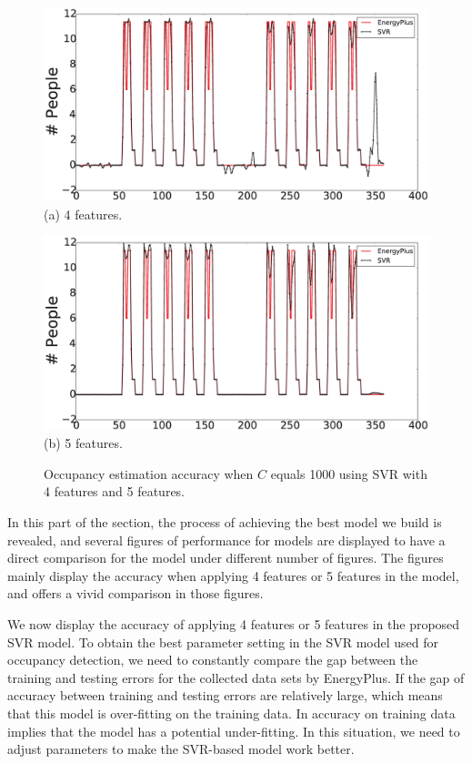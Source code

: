 \begin{figure}[h]
\begin{minipage}{\textwidth}
\centering\includegraphics[width=5in]{./Pics/1000C4Features.eps}
(a) 4 features.
\end{minipage}
\hfill

\vspace{3ex}

\noindent\begin{minipage}{\textwidth}
\centering\includegraphics[width=5in]{./Pics/1000C5Features.eps}
(b) 5 features.
\end{minipage}
\hfill
\caption{Occupancy estimation accuracy when $C$ equals 1000 using SVR with 4 features and 5 features.}\label{fig:compare3}
\end{figure}


In this part of the section, the process of achieving the best model we build is revealed, and several figures of performance for models are displayed to have a direct comparison for the model under different number of figures. The figures mainly display the accuracy when applying 4 features or 5 features in the model, and offers a vivid comparison in those figures.

We now display the accuracy of applying 4 features or 5 features in the proposed SVR model. To obtain the best parameter setting in the SVR model used for occupancy detection, we need to constantly compare the gap between the training and testing errors for the collected data sets by EnergyPlus. If the gap of accuracy between training and testing errors are relatively large, which means that this model is over-fitting on the training data. In accuracy on training data implies that the model has a potential under-fitting. In this situation, we need to adjust parameters to make the SVR-based model work better.

